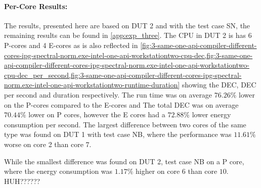 \paragraph{Per-Core Results:} The results, presented here are based on DUT 2 and with the test case SN, the remaining results can be found in \cref{app:exp_three}. The CPU in DUT 2 is has 6 P-cores and 4 E-cores as is also reflected in \cref{fig:3-same-one-api-compiler-different-cores-ipg-spectral-norm.exe-intel-one-api-workstationtwo-cpu-dec,fig:3-same-one-api-compiler-different-cores-ipg-spectral-norm.exe-intel-one-api-workstationtwo-cpu-dec_per_second,fig:3-same-one-api-compiler-different-cores-ipg-spectral-norm.exe-intel-one-api-workstationtwo-runtime-duration} showing the DEC, DEC per second and duration respectively. The run time was on average $76.26\%$ lower on the P-cores compared to the E-cores and The total DEC was on average $70.44\%$ lower on P cores, however the E cores had a $72.88\%$ lower energy consumption per second. %
The largest difference between two cores of the same type was found on DUT 1 with test case NB, where the performance was $11.61\%$ worse on core 2 than core 7. 

While the smallest difference was found on DUT 2, test case NB on a P core, where the energy consumption was $1.17\%$ higher on core $6$ than core $10$.  HUH??????







